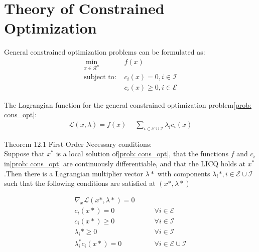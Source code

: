 \documentclass[11pt]{article}
\begin{document}
    \section{Theory of Constrained Optimization} \label{sec: theory_cons_opt}
    General constrained optimization problems can be formulated as:
    \begin{subequations}
        \begin{align*}
            \min_{x\in\mathcal{R}^n} &f(x) \tag{12.1} \label{prob: cons_opt}\\
            \text{subject to: } &c_i(x) = 0, i\in\mathcal{I}\\
            &c_i(x) \geq 0, i\in\mathcal{E}
        \end{align*}
    \end{subequations}

    The Lagrangian function for the general constrained optimization problem\eqref{prob: cons_opt}:
    \begin{align}
        \mathcal{L}(x, \lambda) = f(x) - \sum_{i\in\mathcal{E}\cup\mathcal{I}} \lambda_i c_i(x) \tag{12.33} \label{Lag: general_cons_opt}
    \end{align}

    Theorem 12.1 First-Order Necessary conditions:\\
    Suppose that $x^*$ is a local solution of\eqref{prob: cons_opt}, that the functions $f$ and $c_i$ in\eqref{prob: cons_opt}
    are continuously differentiable, and that the LICQ holds at $x^*$.Then there is a Lagrangian multiplier vector $\lambda*$
    with components $\lambda_i*, i\in\mathcal{E}\cup\mathcal{I}$ such that the following conditions are satisfied at $(x*, \lambda*)$

    \begin{align}
        \nabla_x \mathcal{L}(x*, \lambda*) = 0& \tag{12.34a} \label{KKT: derivative}\\
        c_i(x*) = 0 & \qquad \forall i\in\mathcal{E} \tag{12.34b} \label{KKT: equality}\\
        c_i(x*) \geq 0 & \qquad \forall i\in\mathcal{I} \tag{12.34c} \label{KKT: inequality}\\
        \lambda_i* \geq 0 & \qquad \forall i\in\mathcal{I} \tag{12.34d} \label{KKT: multiplier}\\
        \lambda_i^*c_i(x*) = 0 & \qquad \forall i \in\mathcal{E}\cup\mathcal{I} \tag{12.34e} \label{KKT: complementary}
    \end{align}
\end{document}
